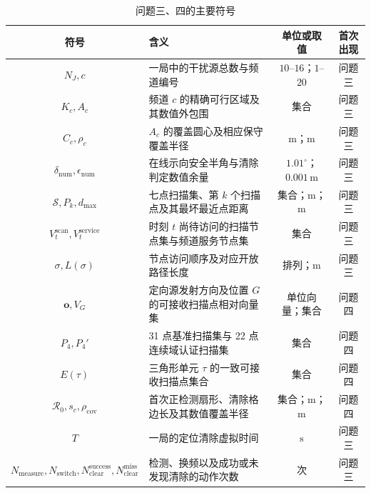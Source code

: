 \begin{table}[H]
\centering
\small
\caption{问题三、四的主要符号}
\label{tab:symbols_q34}
\begin{tabularx}{\textwidth}{C X C C}
\toprule
符号 & 含义 & 单位或取值 & 首次出现 \\
\midrule
$N_J,c$ & 一局中的干扰源总数与频道编号 & $10$--$16$；$1$--$20$ & 问题三 \\
$K_c,A_c$ & 频道 $c$ 的精确可行区域及其数值外包围 & 集合 & 问题三 \\
$C_c,\rho_c$ & $A_c$ 的覆盖圆心及相应保守覆盖半径 & $\mathrm m$；$\mathrm m$ & 问题三 \\
$\delta_{\mathrm{num}},\epsilon_{\mathrm{num}}$ & 在线示向安全半角与清除判定数值余量 & $1.01^\circ$；$0.001\,\mathrm m$ & 问题三 \\
$\mathcal S,P_k,d_{\max}$ & 七点扫描集、第 $k$ 个扫描点及其最坏最近点距离 & 集合；$\mathrm m$；$\mathrm m$ & 问题三 \\
$V_t^{\mathrm{scan}},V_t^{\mathrm{service}}$ & 时刻 $t$ 尚待访问的扫描节点集与频道服务节点集 & 集合 & 问题三 \\
$\sigma,L(\sigma)$ & 节点访问顺序及对应开放路径长度 & 排列；$\mathrm m$ & 问题三 \\
$\boldsymbol o,V_G$ & 定向源发射方向及位置 $G$ 的可接收扫描点相对向量集 & 单位向量；集合 & 问题四 \\
$P_4,P_4'$ & 31 点基准扫描集与 22 点连续域认证扫描集 & 集合 & 问题四 \\
$E(\tau)$ & 三角形单元 $\tau$ 的一致可接收扫描点集合 & 集合 & 问题四 \\
$\mathcal R_0,s_c,\rho_{\mathrm{cov}}$ & 首次正检测扇形、清除格边长及其数值覆盖半径 & 集合；$\mathrm m$；$\mathrm m$ & 问题四 \\
$T$ & 一局的定位清除虚拟时间 & $\mathrm s$ & 问题三 \\
$N_{\mathrm{measure}},N_{\mathrm{switch}},N_{\mathrm{clear}}^{\mathrm{success}},N_{\mathrm{clear}}^{\mathrm{miss}}$ & 检测、换频以及成功或未发现清除的动作次数 & 次 & 问题三 \\
\bottomrule
\end{tabularx}
\end{table}
